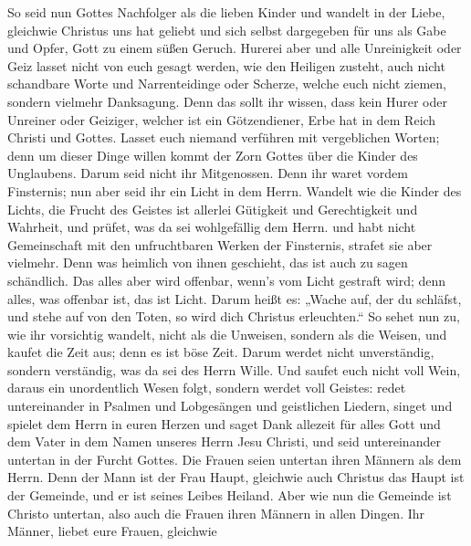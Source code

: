  So seid nun Gottes Nachfolger als die lieben Kinder
 und wandelt in der Liebe, gleichwie Christus uns hat
geliebt und sich selbst dargegeben für uns als Gabe und Opfer, Gott zu
einem süßen Geruch.  Hurerei aber und alle Unreinigkeit
oder Geiz lasset nicht von euch gesagt werden, wie den Heiligen zusteht,
 auch nicht schandbare Worte und Narrenteidinge oder
Scherze, welche euch nicht ziemen, sondern vielmehr Danksagung.
 Denn das sollt ihr wissen, dass kein Hurer oder Unreiner
oder Geiziger, welcher ist ein Götzendiener, Erbe hat in dem Reich
Christi und Gottes.  Lasset euch niemand verführen mit
vergeblichen Worten; denn um dieser Dinge willen kommt der Zorn Gottes
über die Kinder des Unglaubens.  Darum seid nicht ihr
Mitgenossen.  Denn ihr waret vordem Finsternis; nun aber
seid ihr ein Licht in dem Herrn.  Wandelt wie die Kinder
des Lichts, die Frucht des Geistes ist allerlei Gütigkeit und
Gerechtigkeit und Wahrheit,  und prüfet, was da sei
wohlgefällig dem Herrn.  und habt nicht Gemeinschaft mit
den unfruchtbaren Werken der Finsternis, strafet sie aber vielmehr.
 Denn was heimlich von ihnen geschieht, das ist auch zu
sagen schändlich.  Das alles aber wird offenbar, wenn's
vom Licht gestraft wird; denn alles, was offenbar ist, das ist Licht.
 Darum heißt es: „Wache auf, der du schläfst, und stehe
auf von den Toten, so wird dich Christus erleuchten.`` 
So sehet nun zu, wie ihr vorsichtig wandelt, nicht als die Unweisen,
sondern als die Weisen,  und kaufet die Zeit aus; denn es
ist böse Zeit.  Darum werdet nicht unverständig, sondern
verständig, was da sei des Herrn Wille.  Und saufet euch
nicht voll Wein, daraus ein unordentlich Wesen folgt, sondern werdet
voll Geistes:  redet untereinander in Psalmen und
Lobgesängen und geistlichen Liedern, singet und spielet dem Herrn in
euren Herzen  und saget Dank allezeit für alles Gott und
dem Vater in dem Namen unseres Herrn Jesu Christi,  und
seid untereinander untertan in der Furcht Gottes.  Die
Frauen seien untertan ihren Männern als dem Herrn.  Denn
der Mann ist der Frau Haupt, gleichwie auch Christus das Haupt ist der
Gemeinde, und er ist seines Leibes Heiland.  Aber wie nun
die Gemeinde ist Christo untertan, also auch die Frauen ihren Männern in
allen Dingen.  Ihr Männer, liebet eure Frauen, gleichwie

